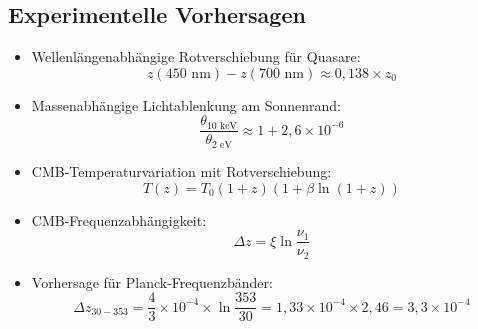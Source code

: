 \documentclass[12pt,a4paper]{article}
\begin{document}
\subsection{Experimentelle Vorhersagen}
\begin{itemize}
	\item Wellenlängenabhängige Rotverschiebung für Quasare:
	\begin{equation}
		z(450\text{ nm}) - z(700\text{ nm}) \approx 0,138 \times z_0
	\end{equation}
	
	\item Massenabhängige Lichtablenkung am Sonnenrand:
	\begin{equation}
		\frac{\theta_{10\text{ keV}}}{\theta_{2\text{ eV}}} \approx 1 + 2,6 \times 10^{-6}
	\end{equation}
	
	\item CMB-Temperaturvariation mit Rotverschiebung:
	\begin{equation}
		T(z) = T_0(1+z)\left(1 + \beta \ln(1+z)\right)
	\end{equation}
	
	\item CMB-Frequenzabhängigkeit:
	\begin{equation}
		\Delta z = \xi \ln\frac{\nu_1}{\nu_2}
	\end{equation}
	
	\item Vorhersage für Planck-Frequenzbänder:
	\begin{equation}
		\Delta z_{30-353} = \frac{4}{3} \times 10^{-4} \times \ln\frac{353}{30} = 1,33 \times 10^{-4} \times 2,46 = 3,3 \times 10^{-4}
	\end{equation}
\end{itemize}
\end{document}
